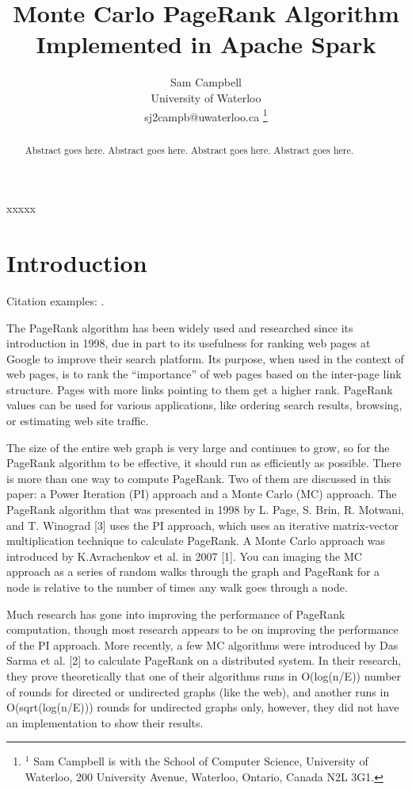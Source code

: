 \documentclass[letterpaper, 10 pt, conference]{ieeeconf}  %
\title{\LARGE \bf Monte Carlo PageRank Algorithm Implemented in Apache Spark}
\author{Sam Campbell \\  %
University of Waterloo \\
sj2campb@uwaterloo.ca
\thanks{$^{1}$ Sam Campbell is with the 
 School of Computer Science, University of Waterloo,
200 University Avenue, Waterloo, Ontario, Canada N2L 3G1.        {\tt\small }}%
}
\begin{document}
\maketitle
\thispagestyle{empty}
\pagestyle{empty}
%
\begin{abstract}
Abstract goes here. Abstract goes here. Abstract goes here. Abstract goes here.
\end{abstract}
%
\begin{keywords}
xxxxx
\end{keywords}
%
\section{Introduction}

Citation examples: \cite{An82,An09,Go89,Ra10}.

\label{sec:intro}
The PageRank algorithm has been widely used and researched since its introduction in 1998, due in part to its usefulness for ranking web pages at Google to improve their search platform. Its purpose, when used in the context of web pages, is to rank the “importance” of web pages based on the inter-page link structure. Pages with more links pointing to them get a higher rank. PageRank values can be used for various applications, like ordering search results, browsing, or estimating web site traffic.

The size of the entire web graph is very large and continues to grow, so for the PageRank algorithm to be effective, it should run as efficiently as possible. There is more than one way to compute PageRank. Two of them are discussed in this paper: a Power Iteration (PI) approach and a Monte Carlo (MC) approach. The PageRank algorithm that was presented in 1998 by L. Page, S. Brin, R. Motwani, and T. Winograd [3] uses the PI approach, which uses an iterative matrix-vector multiplication technique to calculate PageRank. A Monte Carlo approach was introduced by K.Avrachenkov et al. in 2007 [1]. You can imaging the MC approach as a series of random walks through the graph and PageRank for a node is relative to the number of times any walk goes through a node.

Much research has gone into improving the performance of PageRank computation, though most research appears to be on improving the performance of the PI approach. More recently, a few MC algorithms were introduced by Das Sarma et al. [2] to calculate PageRank on a distributed system. In their research, they prove theoretically that one of their algorithms runs in O(log(n/E)) number of rounds for directed or undirected graphs (like the web), and another runs in O(sqrt(log(n/E))) rounds for undirected graphs only, however, they did not have an implementation to show their results.
\end{document}
